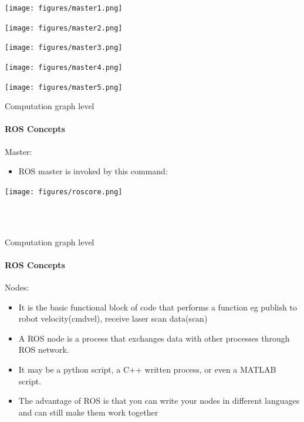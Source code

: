 \documentclass{beamer}
\begin{document}
     \begin{frame}[plain]{}
     \centering
     \texttt{[image: figures/master1.png]}                                                              
     \end{frame} 
     \begin{frame}[plain]{}
         \centering
         \texttt{[image: figures/master2.png]}                                                              
      \end{frame} 
     \begin{frame}[plain]{}
         \centering
         \texttt{[image: figures/master3.png]}                                                              
        \end{frame} 
     \begin{frame}[plain]{}
         \centering
         \texttt{[image: figures/master4.png]}                                                              
        \end{frame}
     \begin{frame}[plain]{}
         \centering
         \texttt{[image: figures/master5.png]}                                                              
       \end{frame}                             

\begin{frame}{Computation graph level}
    \framesubtitle{ROS Concepts}
    {\huge Master:}
    \vspace{0.2cm}
    \begin{itemize}
        \item ROS master is invoked by this command:
    \end{itemize}
         \centering
         \texttt{[image: figures/roscore.png]}     
\end{frame}


\begin{frame}[plain]{}  
    \centering
     {\huge \textcolor{white}{Example \\ (TurtleSim)} }
\end{frame}
\begin{frame}{Computation graph level}
    \framesubtitle{ROS Concepts}
    {\huge Nodes:}
    \vspace{1cm}
    \begin{itemize}
        \item It is the basic functional block of code that performs a function eg publish to robot velocity(cmdvel), receive laser scan data(scan)
        \item A ROS node is a process that exchanges data with other processes through ROS network.
        \item It may be a python script, a C++ written process, or even a MATLAB script.
        \item The advantage of ROS is that you can write your nodes in different languages and can still make them work together 
       
    \end{itemize}
\end{frame}
\end{document}

